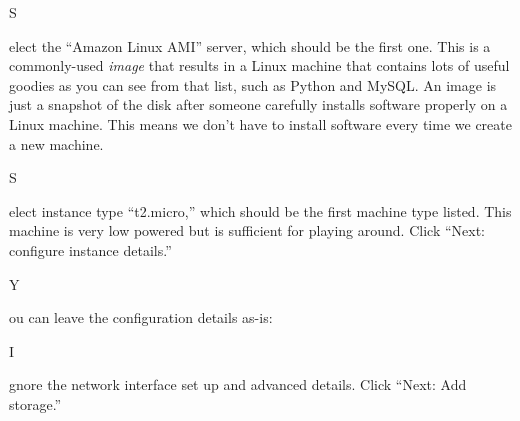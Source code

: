 \documentclass[titlepage]{tufte-book}
\newcounter{problem}
\newcommand{\step}[1]{{}
\vspace{4pt} \noindent {\bf \theproblem. }#1\addtocounter{problem}{1}}
\begin{document}
\begin{fullwidth}
\step Select the ``Amazon Linux AMI'' server, which should be the first one.  This is a commonly-used {\em image} that results in a Linux machine that contains lots of useful goodies as you can see from that list, such as Python and MySQL. An image is just a snapshot of the disk after someone carefully installs software properly on a Linux machine. This means we don't have to install software every time we create a new machine.


\step Select instance type ``t2.micro,'' which should be the first machine type listed. This machine is very low powered but is sufficient for playing around. Click ``Next: configure instance details.''


\step  You can leave the configuration details as-is:


\step  Ignore the network interface set up and advanced details.  Click ``Next: Add storage.''


\end{fullwidth}
\end{document}
